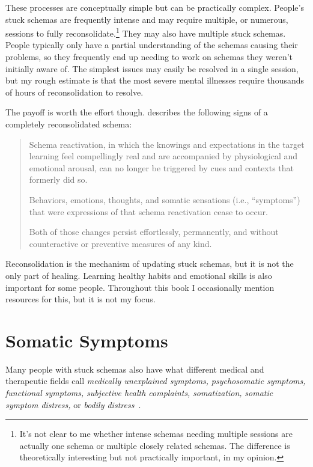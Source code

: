 \documentclass[11pt,oneside]{book}
\let\cite\parencite
\begin{document}
These processes are conceptually simple but can be practically complex. People's stuck schemas are frequently intense and may require multiple, or numerous, sessions to fully reconsolidate.\footnote{It's not clear to me whether intense schemas needing multiple sessions are actually one schema or multiple closely related schemas. The difference is theoretically interesting but not practically important, in my opinion.} They may also have multiple stuck schemas. People typically only have a partial understanding of the schemas causing their problems, so they frequently end up needing to work on schemas they weren't initially aware of. The simplest issues may easily be resolved in a single session, but my rough estimate is that the most severe mental illnesses require thousands of hours of reconsolidation to resolve.

The payoff is worth the effort though. \textcite[p. 22]{eckerUnlocking} describes the following signs of a completely reconsolidated schema:
\begin{quotation}
    Schema reactivation, in which the knowings and expectations in the target learning feel compellingly real and are accompanied by physiological and emotional arousal, can no longer be triggered by cues and contexts that formerly did so.

    Behaviors, emotions, thoughts, and somatic sensations (i.e., \enquote{symptoms}) that were expressions of that schema reactivation cease to occur.

    Both of those changes persist effortlessly, permanently, and without counteractive or preventive measures of any kind.
\end{quotation}

Reconsolidation is the mechanism of updating stuck schemas, but it is not the only part of healing. Learning healthy habits and emotional skills is also important for some people. Throughout this book I occasionally mention resources for this, but it is not my focus.

\section{Somatic Symptoms}
\label{psychogenic}
Many people with stuck schemas also have what different medical and therapeutic fields call \textit{medically unexplained symptoms,} \textit{psychosomatic symptoms,} \textit{functional symptoms,} \textit{subjective health complaints,} \textit{somatization,} \textit{somatic symptom distress,} or \textit{bodily distress}~\cite{berghPsychogenic}.
\end{document}
